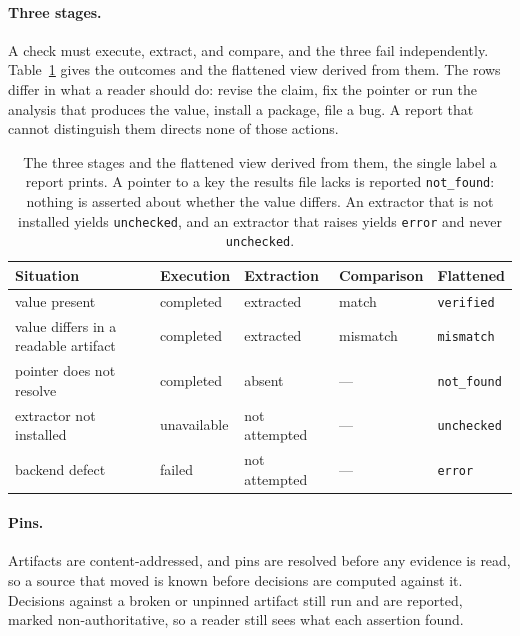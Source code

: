 \documentclass{article}
\newcommand{\code}[1]{\texttt{#1}}
\begin{document}
\paragraph{Three stages.} A check must execute, extract, and compare, and the three fail
independently. Table~\ref{tab:stages} gives the outcomes and the flattened view derived from them.
The rows differ in what a reader should do: revise the claim, fix the pointer or run the analysis
that produces the value, install a package, file a bug. A report that cannot distinguish them
directs none of those actions.

\begin{table}[h]
\centering
\small
\caption{The three stages and the flattened view derived from them, the single label a report
prints. A pointer to a key the results file lacks is reported \code{not\_found}: nothing is
asserted about whether the value differs. An extractor that is not installed yields
\code{unchecked}, and an extractor that raises yields \code{error} and never \code{unchecked}.}
\label{tab:stages}
\begin{tabular}{@{}>{\raggedright\arraybackslash}p{}lll>{\raggedright\arraybackslash}p{}@{}}
\toprule
\textbf{Situation} & \textbf{Execution} & \textbf{Extraction} & \textbf{Comparison} & \textbf{Flattened} \\
\midrule
value present & completed & extracted & match & \code{verified} \\
value differs in a readable artifact & completed & extracted & mismatch & \code{mismatch} \\
pointer does not resolve & completed & absent & --- & \code{not\_found} \\
extractor not installed & unavailable & not attempted & --- & \code{unchecked} \\
backend defect & failed & not attempted & --- & \code{error} \\
\bottomrule
\end{tabular}
\end{table}

\paragraph{Pins.} Artifacts are content-addressed, and pins are resolved before any evidence is
read, so a source that moved is known before decisions are computed against it. Decisions against
a broken or unpinned artifact still run and are reported, marked non-authoritative, so a reader
still sees what each assertion found.
\end{document}
